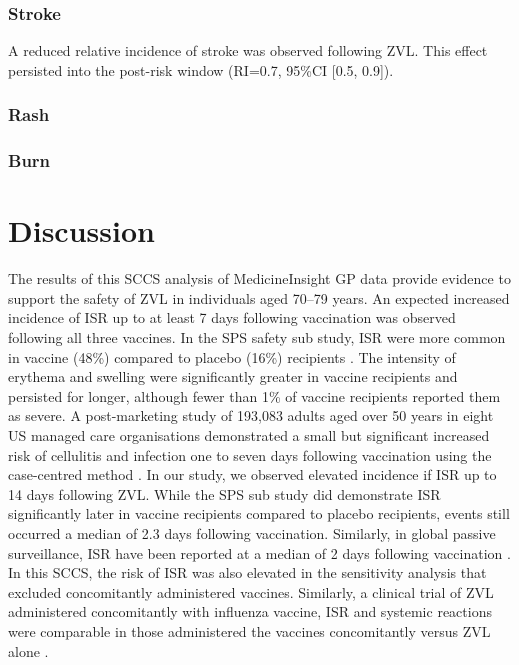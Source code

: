 \documentclass[review, endfloat]{elsarticle}
\begin{document}
\subsubsection{Stroke}

A reduced relative incidence of stroke was observed following ZVL. This effect persisted into the post-risk window (RI=0.7, 95\%CI [0.5, 0.9]). 

\subsubsection{Rash}


\subsubsection{Burn}



\section{Discussion}

The results of this SCCS analysis of MedicineInsight GP data provide evidence to support the safety of ZVL in individuals aged 70–79 years. An expected increased incidence of ISR up to at least 7 days following vaccination was observed following all three vaccines. In the SPS safety sub study, ISR were more common in vaccine (48\%) compared to placebo (16\%) recipients \citep{simberkoff2010}. The intensity of erythema and swelling were significantly greater in vaccine recipients and persisted for longer, although fewer than 1\% of vaccine recipients reported them as severe. A post-marketing study of 193,083 adults aged over 50 years in eight US managed care organisations demonstrated a small but significant increased risk of cellulitis and infection one to seven days following vaccination using the case-centred method \citep{tseng2012}. In our study, we observed elevated incidence if ISR up to 14 days following ZVL. While the SPS sub study did demonstrate ISR significantly later in vaccine recipients compared to placebo recipients, events still occurred a median of 2.3 days following vaccination. Similarly, in global passive surveillance, ISR have been reported at a median of 2 days following vaccination \citep{willis2017herpes}. In this SCCS, the risk of ISR was also elevated in the sensitivity analysis that excluded concomitantly administered vaccines. Similarly, a clinical trial of ZVL administered concomitantly with influenza vaccine, ISR and systemic reactions were comparable in those administered the vaccines concomitantly versus ZVL alone \citep{levin2018immunogenicity}.
\end{document}
